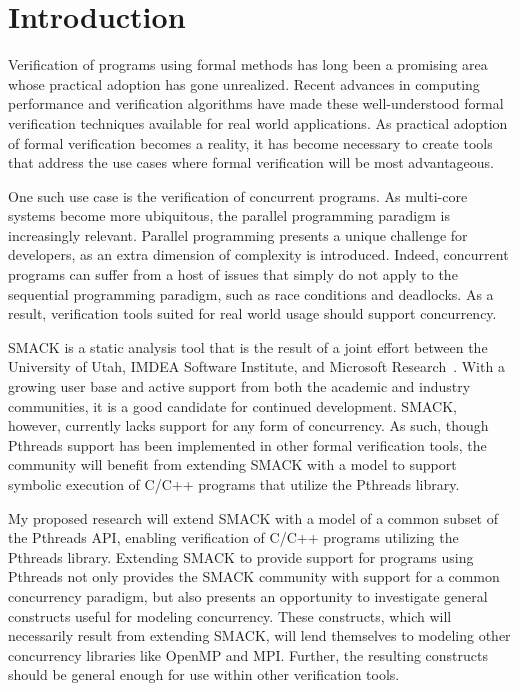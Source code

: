 \chapter{Introduction}\label{thesis_intro}

Verification of programs using formal methods has long been a promising area whose practical adoption has gone unrealized.  Recent advances in computing performance and verification algorithms have made these well-understood formal verification techniques available for real world applications.  As practical adoption of formal verification becomes a reality, it has become necessary to create tools that address the use cases where formal verification will be most advantageous.

One such use case is the verification of concurrent programs.  As multi-core systems become more ubiquitous, the parallel programming paradigm is increasingly relevant.  Parallel programming presents a unique challenge for developers, as an extra dimension of complexity is introduced.  Indeed, concurrent programs can suffer from a host of issues that simply do not apply to the sequential programming paradigm, such as race conditions and deadlocks.  As a result, verification tools suited for real world usage should support concurrency.

SMACK is a static analysis tool that is the result of a joint effort between the University of Utah, IMDEA Software Institute, and Microsoft Research~\cite{smack}.  With a growing user base and active support from both the academic and industry communities, it is a good candidate for continued development.  SMACK, however, currently lacks support for any form of concurrency.  As such, though Pthreads support has been implemented in other formal verification tools, the community will benefit from extending SMACK with a model to support symbolic execution of C/C++ programs that utilize the Pthreads library.

My proposed research will extend SMACK with a model of a common subset of the Pthreads API, enabling verification of C/C++ programs utilizing the Pthreads library.  Extending SMACK to provide support for programs using Pthreads not only provides the SMACK community with support for a common concurrency paradigm, but also presents an opportunity to investigate general constructs useful for modeling concurrency.  These constructs, which will necessarily result from extending SMACK, will lend themselves to modeling other concurrency libraries like OpenMP and MPI.  Further, the resulting constructs should be general enough for use within other verification tools.
